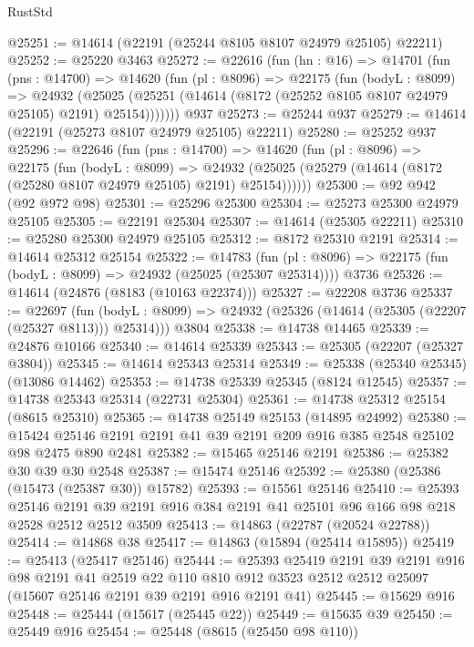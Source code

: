 \begin{lexlean}{RustStd}
\begin{coremodule}
@25251 := @14614 (@22191 (@25244 @8105 @8107 @24979 @25105) @22211)
@25252 := @25220 @3463
@25272 := @22616
    (fun (hn : @16) =>
    @14701
      (fun (pns : @14700) =>
      @14620
        (fun (pl : @8096) =>
        @22175
          (fun (bodyL : @8099) =>
          @24932
            (@25025 (@25251 (@14614 (@8172 (@25252 @8105 @8107 @24979 @25105) @2191) @25154)))))))
    @937
@25273 := @25244 @937
@25279 := @14614 (@22191 (@25273 @8107 @24979 @25105) @22211)
@25280 := @25252 @937
@25296 := @22646
    (fun (pns : @14700) =>
    @14620
      (fun (pl : @8096) =>
      @22175
        (fun (bodyL : @8099) =>
        @24932 (@25025 (@25279 (@14614 (@8172 (@25280 @8107 @24979 @25105) @2191) @25154))))))
@25300 := @92 @942 (@92 @972 @98)
@25301 := @25296 @25300
@25304 := @25273 @25300 @24979 @25105
@25305 := @22191 @25304
@25307 := @14614 (@25305 @22211)
@25310 := @25280 @25300 @24979 @25105
@25312 := @8172 @25310 @2191
@25314 := @14614 @25312 @25154
@25322 := @14783
    (fun (pl : @8096) => @22175 (fun (bodyL : @8099) => @24932 (@25025 (@25307 @25314))))
    @3736
@25326 := @14614 (@24876 (@8183 (@10163 @22374)))
@25327 := @22208 @3736
@25337 := @22697
    (fun (bodyL : @8099) => @24932 (@25326 (@14614 (@25305 (@22207 (@25327 @8113))) @25314)))
    @3804
@25338 := @14738 @14465
@25339 := @24876 @10166
@25340 := @14614 @25339
@25343 := @25305 (@22207 (@25327 @3804))
@25345 := @14614 @25343 @25314
@25349 := @25338 (@25340 @25345) (@13086 @14462)
@25353 := @14738 @25339 @25345 (@8124 @12545)
@25357 := @14738 @25343 @25314 (@22731 @25304)
@25361 := @14738 @25312 @25154 (@8615 @25310)
@25365 := @14738 @25149 @25153 (@14895 @24992)
@25380 := @15424 @25146 @2191 @2191 @41 @39 @2191 @209 @916 @385 @2548 @25102 @98 @2475 @890 @2481
@25382 := @15465 @25146 @2191
@25386 := @25382 @30 @39 @30 @2548
@25387 := @15474 @25146
@25392 := @25380 (@25386 (@15473 (@25387 @30)) @15782)
@25393 := @15561 @25146
@25410 := @25393
    @25146
    @2191
    @39
    @2191
    @916
    @384
    @2191
    @41
    @25101
    @96
    @166
    @98
    @218
    @2528
    @2512
    @2512
    @3509
@25413 := @14863 (@22787 (@20524 @22788))
@25414 := @14868 @38
@25417 := @14863 (@15894 (@25414 @15895))
@25419 := @25413 (@25417 @25146)
@25444 := @25393
    @25419
    @2191
    @39
    @2191
    @916
    @98
    @2191
    @41
    @2519
    @22
    @110
    @810
    @912
    @3523
    @2512
    @2512
    @25097
    (@15607 @25146 @2191 @39 @2191 @916 @2191 @41)
@25445 := @15629 @916
@25448 := @25444 (@15617 (@25445 @22))
@25449 := @15635 @39
@25450 := @25449 @916
@25454 := @25448 (@8615 (@25450 @98 @110))

\end{coremodule}
\end{lexlean}
